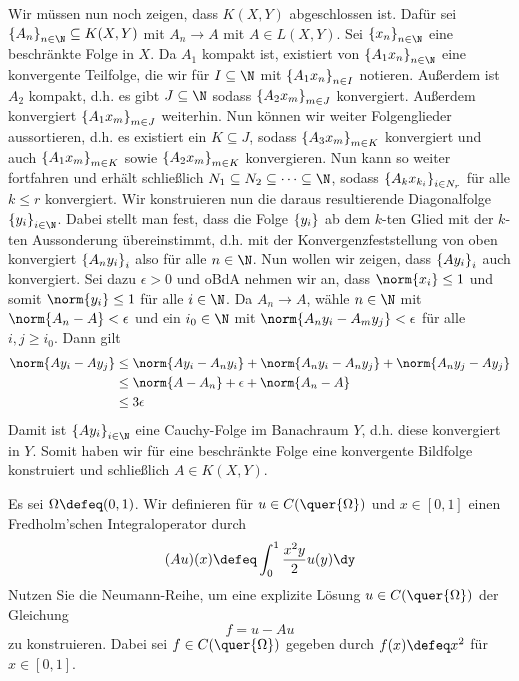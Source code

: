 \begin{exercisePage}
\begin{enumerate}[label=(zu \alph*), leftmargin=\zulength]
	Wir müssen nun noch zeigen, dass $K(X,Y)$ abgeschlossen ist. Dafür sei $\folge{A_n}{n \in \N} \subseteq K(X,Y)$ mit $A_n \to A$ mit $A \in L(X,Y)$. %
	Sei $\folge{x_n}{n \in \N}$ eine beschränkte Folge in $X$. Da $A_1$ kompakt ist, existiert von $\folge{A_1 x_n}{n \in \N}$ eine konvergente Teilfolge, die wir für $I \subseteq \N$ mit $\left\{ A_1 x_n \right\}_{n \in I}$ notieren. Außerdem ist $A_2$ kompakt, d.h. es gibt $J \subseteq \N$ sodass $\left\{ A_2 x_m \right\}_{m \in J}$ konvergiert. Außerdem konvergiert $\left\{ A_1 x_m \right\}_{m \in J}$ weiterhin. Nun können wir weiter Folgenglieder aussortieren, d.h. es existiert ein $K \subseteq J$, sodass $\left\{ A_3 x_m \right\}_{m \in K}$ konvergiert und auch $\left\{ A_1 x_m \right\}_{m \in K}$ sowie $\left\{ A_2 x_m \right\}_{m \in K}$ konvergieren. Nun kann so weiter fortfahren und erhält schließlich $N_1 \subseteq N_2 \subseteq \cdots \subseteq \N$, sodass $\left\{ A_k x_{k_i} \right\}_{i \in N_r}$ für alle $k \le r$ konvergiert. Wir konstruieren nun die daraus resultierende Diagonalfolge $\folge{y_i}{i \in \N}$. Dabei stellt man fest, dass die Folge $\left\{ y_i \right\}_{}$ ab dem $k$-ten Glied mit der $k$-ten Aussonderung übereinstimmt, d.h. mit der Konvergenzfeststellung von oben konvergiert $\left\{ A_n y_i \right\}_{i}$ also für alle $n \in \N$. Nun wollen wir zeigen, dass $\left\{ A y_i \right\}_{i}$ auch konvergiert. Sei dazu $\epsilon > 0$ und oBdA nehmen wir an, dass $\norm{x_i} \le 1$ und somit $\norm{y_i} \le 1$ für alle $i \in \N$. Da $A_n \to A$, wähle $n \in \N$ mit $\norm{A_n - A} < \epsilon$ und ein $i_0 \in \N$ mit $\norm{A_n y_i - A_m y_j} < \epsilon$ für alle $i,j \ge i_0$. Dann gilt
	\begin{equation*}
		\begin{aligned}
			\norm{A y_i - A y_j} &\le \norm{A y_i - A_n y_i} + \norm{A_n y_i - A_n y_j} + \norm{A_n y_j - A y_j} \\
			&\le \norm{A - A_n} + \epsilon + \norm{A_n - A} \\
			&\le 3\epsilon
		\end{aligned}
	\end{equation*}
	Damit ist $\folge{A y_i}{i \in \N}$ eine Cauchy-Folge im Banachraum $Y$, d.h. diese konvergiert in $Y$. Somit haben wir für eine beschränkte Folge eine konvergente Bildfolge konstruiert und schließlich $A \in K(X,Y)$.
\end{enumerate}

\begin{exercise}
	Es sei $\Omega \defeq (0,1)$. Wir definieren für $u \in C(\quer{\Omega})$ und $x \in [0,1]$ einen Fredholm'schen Integraloperator durch
	\begin{equation*}
		(Au)(x) \defeq \int_0^1 \frac{x^2y}{2} u(y) \dy
	\end{equation*}
	Nutzen Sie die Neumann-Reihe, um eine explizite Lösung $u \in C(\quer{\Omega})$ der Gleichung
	\begin{equation*}
		f = u - Au
	\end{equation*}
	zu konstruieren. Dabei sei $f \in C(\quer{\Omega})$ gegeben durch $f(x) \defeq x^2$ für $x \in [0,1]$.
\end{exercise}


\end{exercisePage}

